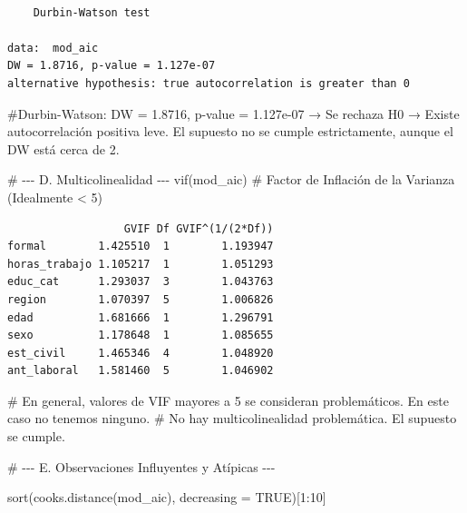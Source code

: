 \documentclass[
  spanish,
  letterpaper,
  DIV=11,
  numbers=noendperiod]{scrartcl}
\newenvironment{Shaded}{\begin{snugshade}}{\end{snugshade}}
\newcommand{\AttributeTok}[1]{\textcolor[rgb]{0.40,0.45,0.13}{#1}}
\newcommand{\CommentTok}[1]{\textcolor[rgb]{0.37,0.37,0.37}{#1}}
\newcommand{\ConstantTok}[1]{\textcolor[rgb]{0.56,0.35,0.01}{#1}}
\newcommand{\DecValTok}[1]{\textcolor[rgb]{0.68,0.00,0.00}{#1}}
\newcommand{\FunctionTok}[1]{\textcolor[rgb]{0.28,0.35,0.67}{#1}}
\newcommand{\NormalTok}[1]{\textcolor[rgb]{0.00,0.23,0.31}{#1}}
\newcommand{\SpecialCharTok}[1]{\textcolor[rgb]{0.37,0.37,0.37}{#1}}
\begin{document}
\begin{verbatim}

    Durbin-Watson test

data:  mod_aic
DW = 1.8716, p-value = 1.127e-07
alternative hypothesis: true autocorrelation is greater than 0
\end{verbatim}

\begin{Shaded}
\begin{Highlighting}[]
\CommentTok{\#Durbin{-}Watson: DW = 1.8716, p{-}value = 1.127e{-}07 → Se rechaza H0 → Existe autocorrelación positiva leve. El supuesto no se cumple estrictamente, aunque el DW está cerca de 2.}
\end{Highlighting}
\end{Shaded}

\begin{Shaded}
\begin{Highlighting}[]
\CommentTok{\# {-}{-}{-} D. Multicolinealidad {-}{-}{-}}
\FunctionTok{vif}\NormalTok{(mod\_aic) }\CommentTok{\# Factor de Inflación de la Varianza (Idealmente \textless{} 5)}
\end{Highlighting}
\end{Shaded}

\begin{verbatim}
                  GVIF Df GVIF^(1/(2*Df))
formal        1.425510  1        1.193947
horas_trabajo 1.105217  1        1.051293
educ_cat      1.293037  3        1.043763
region        1.070397  5        1.006826
edad          1.681666  1        1.296791
sexo          1.178648  1        1.085655
est_civil     1.465346  4        1.048920
ant_laboral   1.581460  5        1.046902
\end{verbatim}

\begin{Shaded}
\begin{Highlighting}[]
\CommentTok{\# En general, valores de VIF mayores a 5 se consideran problemáticos. En este caso no tenemos ninguno. }
\CommentTok{\# No hay multicolinealidad problemática. El supuesto se cumple.}

\CommentTok{\# {-}{-}{-} E. Observaciones Influyentes y Atípicas {-}{-}{-}}

\FunctionTok{sort}\NormalTok{(}\FunctionTok{cooks.distance}\NormalTok{(mod\_aic), }\AttributeTok{decreasing =} \ConstantTok{TRUE}\NormalTok{)[}\DecValTok{1}\SpecialCharTok{:}\DecValTok{10}\NormalTok{]}
\end{Highlighting}
\end{Shaded}
\end{document}
